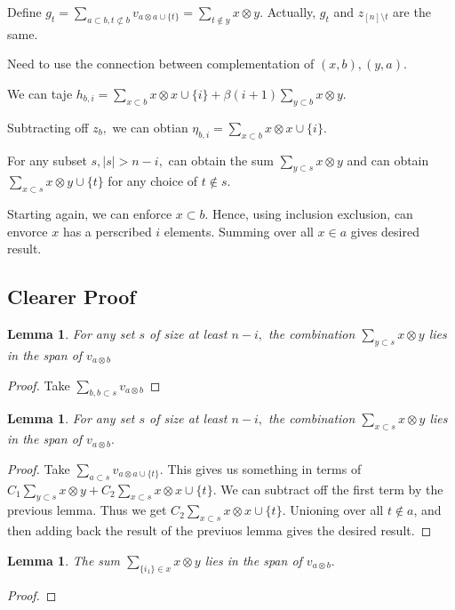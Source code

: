 \documentclass{amsart}
\newtheorem{lem}[subsubsection]{Lemma}
\begin{document}
Define $g_t = \sum_{a\subset b,t\not\subset b}^{}v_{a \otimes a \cup \{t\}}= \sum_{t \notin y}^{}x\otimes y.$
Actually, $g_t$ and $z_{[n]\setminus t}$ are the same.

Need to use the connection between complementation of $(x,b),(y,a).$

We can taje $h_{b,i} = \sum_{x\subset b}^{}x \otimes x \cup \{i\} + \beta(i+1)\sum_{y \subset b}^{}x\otimes y.$

Subtracting off $z_b,$ we can obtian
$\eta_{b,i} = \sum_{x\subset b}^{}x \otimes x \cup \{i\}.$

For any subset $s,|s|>n-i,$ can obtain the sum $\sum_{y \subset s}^{}x\otimes y$ and can obtain $\sum_{x\subset s}^{}x\otimes y \cup \{t\}$ for any choice of $t \notin s.$

Starting again, we can enforce $x \subset b.$ Hence, using inclusion exclusion, can envorce $x$ has a perscribed $i$ elements. Summing over all $x \in a$ gives desired result.

\subsection{Clearer Proof}

\begin{lem}
For any set $s$ of size at least $n-i,$ the combination $\sum_{y \subset s}^{}x\otimes y$ lies in the span of $v_{a\otimes b}$
\end{lem}
\begin{proof}
Take $\sum_{b,b\subset s}^{}v_{a\otimes b}$
\end{proof}

\begin{lem}
For any set $s$ of size at least $n-i,$ the combination $\sum_{x \subset s}^{}x\otimes y$ lies in the span of $v_{a\otimes b}.$
\end{lem}
\begin{proof}
Take $\sum_{a \subset s}^{}v_{a\otimes a \cup \{t\}}.$ This gives us something in terms of $C_1\sum_{y\subset s}^{}x\otimes y + C_2\sum_{x\subset s}^{} x\otimes x\cup \{t\}.$ We can subtract off the first term by the previous lemma. Thus we get $C_2\sum_{x\subset s}^{} x\otimes x\cup \{t\}.$ Unioning over all $t \notin a$, and then adding back the result of the previuos lemma gives the desired result.
\end{proof}

\begin{lem}
The sum $\sum_{\{i_1\}\in x}^{}x\otimes y$ lies in the span of $v_{a\otimes b}.$
\end{lem}
\begin{proof}

\end{proof}
\end{document}
